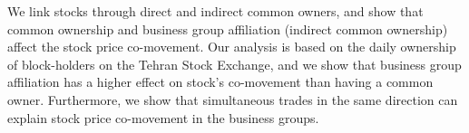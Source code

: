 We link stocks through direct and indirect common owners, and show that common ownership and business group affiliation (indirect common ownership) affect the stock price co-movement. Our analysis is based on the daily ownership of block-holders on the Tehran Stock Exchange, and we show that business group affiliation has a higher effect on stock’s co-movement than having a common owner. Furthermore, we show that simultaneous trades in the same direction can explain stock price co-movement in the business groups.
